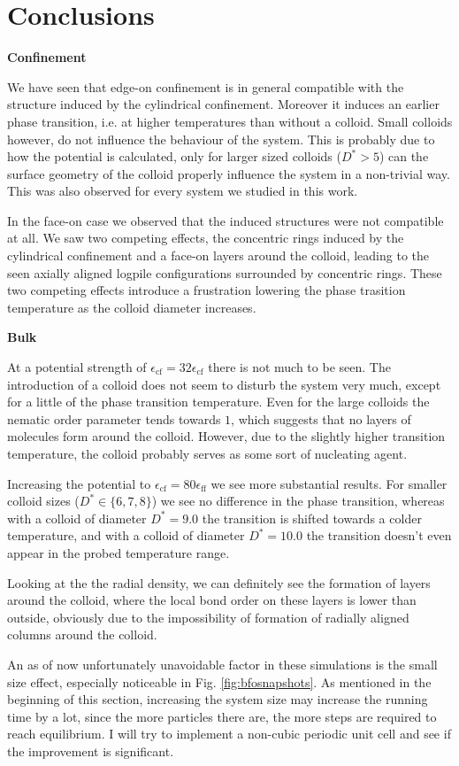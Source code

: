 \chapter{Conclusions}
\vspace{2cm}
\iftrue


\textbf{Confinement}

We have seen that edge-on confinement is in general compatible with the structure induced by the cylindrical confinement. Moreover it induces an earlier phase transition, i.e. at higher temperatures than without a colloid. 
Small colloids however, do not influence the behaviour of the system. This is probably due to how the potential is calculated, only for larger sized colloids  ($D^*>5$) can the surface geometry of the colloid properly influence the system in a non-trivial way. This was also observed for every system we studied in this work.

In the face-on case we observed that the induced structures were not compatible at all. We saw two competing effects, the concentric rings induced by the cylindrical confinement and a face-on layers around the colloid, leading to the seen axially aligned logpile configurations surrounded by concentric rings. These two competing effects introduce a frustration lowering the phase trasition temperature as the colloid diameter increases.  


\textbf{Bulk}

At a potential strength of $\epsilon_{\text{cf}}= 32\epsilon_{\text{cf}}$ there is not much to be seen. The introduction of a colloid does not seem to disturb the system very much, except for a little of the phase transition temperature. Even for the large colloids the nematic order parameter tends towards $1$, which suggests that no layers of molecules form around the colloid. However, due to the slightly higher transition temperature, the colloid probably serves as some sort of nucleating agent. 




Increasing the potential to $\epsilon_{\text{cf}}= 80\epsilon_{\text{ff}}$ we see more substantial results. For smaller colloid sizes ($D^*\in \{6,7,8\}$) we see no difference in the phase transition, whereas with a colloid of diameter $D^*=9.0$ the transition is shifted towards a colder temperature, and with a colloid of diameter $D^*=10.0$ the transition doesn't even appear in the probed temperature range.

Looking at the the radial density, we can definitely see the formation of layers around the colloid, where the local bond order on these layers is lower than outside, obviously due to the impossibility of formation of radially aligned columns around the colloid.


An as of now unfortunately unavoidable factor in these simulations is the small size effect, especially noticeable in Fig. \ref{fig:bfosnapshots}. As mentioned in the beginning of this section, increasing the system size may increase the running time by a lot, since the more particles there are, the more steps are required to reach equilibrium. I will try to implement a non-cubic periodic unit cell and see if the improvement is significant.

